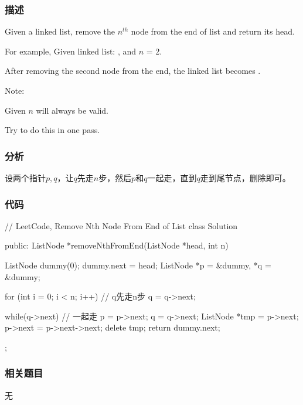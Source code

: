 \subsubsection{描述}
Given a linked list, remove the $n^{th}$ node from the end of list and return its head.

For example, Given linked list: , and $n$ = 2.

After removing the second node from the end, the linked list becomes .

Note:
\begindot
\item Given $n$ will always be valid.
\item Try to do this in one pass.
\myenddot


\subsubsection{分析}
设两个指针$p,q$，让$q$先走$n$步，然后$p$和$q$一起走，直到$q$走到尾节点，删除即可。


\subsubsection{代码}
\begin{Code}
// LeetCode, Remove Nth Node From End of List
class Solution {
public:
    ListNode *removeNthFromEnd(ListNode *head, int n) {
        ListNode dummy(0);
        dummy.next = head;
        ListNode *p = &dummy, *q = &dummy;

        for (int i = 0; i < n; i++) { // q先走n步
            q = q->next;
        }

        while(q->next) { // 一起走
            p = p->next;
            q = q->next;
        }
        ListNode *tmp = p->next;
        p->next = p->next->next;
        delete tmp;
        return dummy.next;
    }
};
\end{Code}


\subsubsection{相关题目}

\begindot
\item 无
\myenddot
